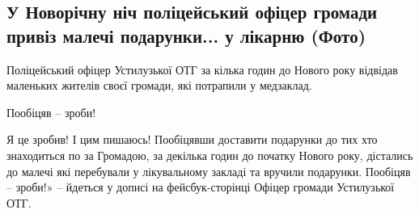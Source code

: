  
 
 
 
 
\subsection{У Новорічну ніч поліцейський офіцер громади привіз малечі подарунки... у лікарню (Фото) }
\label{sec:01_01_2022.stz.news.ua.volyn.1.novyj_god_policeman_deti_podarki}


Поліцейський офіцер Устилузької ОТГ за кілька годин до Нового року відвідав
маленьких жителів своєї громади, які потрапили у медзаклад.

\begin{zznagolos}
Пообіцяв – зроби!
\end{zznagolos}


Я це зробив! І цим пишаюсь! Пообіцявши доставити подарунки до тих хто
знаходиться по за Громадою, за декілька годин до початку Нового року, дістались
до малечі які перебували у лікувальному закладі та вручили подарунки. Пообіцяв
– зроби!» – йдеться у дописі  на фейсбук-сторінці Офіцер громади Устилузької
ОТГ.

